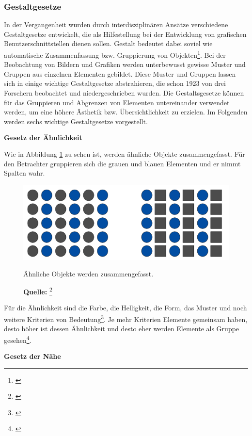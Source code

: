 \subsubsection{Gestaltgesetze}
\label{sec:gestaltgesetze}
In der Vergangenheit wurden durch interdisziplinären Ansätze verschiedene Gestaltgesetze entwickelt, die als Hilfestellung bei der Entwicklung von grafischen Benutzerschnittstellen dienen sollen. Gestalt bedeutet dabei soviel wie automatische Zusammenfassung bzw. Gruppierung von Objekten\footnote{\cite[vgl.][59]{Dahm2006}}. Bei der Beobachtung von Bildern und Grafiken werden unterbewusst gewisse Muster und Gruppen aus einzelnen Elementen gebildet. Diese Muster und Gruppen lassen sich in einige wichtige Gestaltgesetze abstrahieren, die schon 1923 von drei Forschern beobachtet und niedergeschrieben wurden. Die Gestaltsgesetze können für das Gruppieren und Abgrenzen von Elementen untereinander verwendet werden, um eine höhere Ästhetik bzw. Übersichtlichkeit zu erzielen. Im Folgenden werden sechs wichtige Gestaltgesetze vorgestellt.

\textbf{Gesetz der Ähnlichkeit}

Wie in Abbildung \ref{fig:aehnlichkeit} zu sehen ist, werden ähnliche Objekte zusammengefasst. Für den Betrachter gruppieren sich die grauen und blauen Elementen und er nimmt Spalten wahr.
\begin{figure}[H]
  \centering
  \includegraphics[scale=1]{img/gesetz_der_Aehnlichkeit.PNG}
  \caption{Ähnliche Objekte werden zusammengefasst.}
    \caption*{\textbf{Quelle:} \footnote{\cite{Dahm2006}}}
  \label{fig:aehnlichkeit}
\end{figure}
Für die Ähnlichkeit sind die Farbe, die Helligkeit, die Form, das Muster und noch weitere Kriterien von Bedeutung\footnote{\cite[vgl.][59f]{Dahm2006}}. Je mehr Kriterien Elemente gemeinsam haben, desto höher ist dessen Ähnlichkeit und desto eher werden Elemente als Gruppe gesehen\footnote{\cite[vgl.][]{HTMLSeminarDe}}.

\textbf{Gesetz der Nähe}

